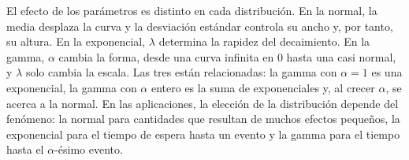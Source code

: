 \documentclass[11pt,letterpaper]{article}
\begin{document}
El efecto de los parámetros es distinto en cada distribución. En la normal, la media desplaza la curva y la desviación estándar controla su ancho y, por tanto, su altura. En la exponencial, $\lambda$ determina la rapidez del decaimiento. En la gamma, $\alpha$ cambia la forma, desde una curva infinita en 0 hasta una casi normal, y $\lambda$ solo cambia la escala. Las tres están relacionadas: la gamma con $\alpha = 1$ es una exponencial, la gamma con $\alpha$ entero es la suma de exponenciales y, al crecer $\alpha$, se acerca a la normal. En las aplicaciones, la elección de la distribución depende del fenómeno: la normal para cantidades que resultan de muchos efectos pequeños, la exponencial para el tiempo de espera hasta un evento y la gamma para el tiempo hasta el $\alpha$-ésimo evento.

\end{document}
